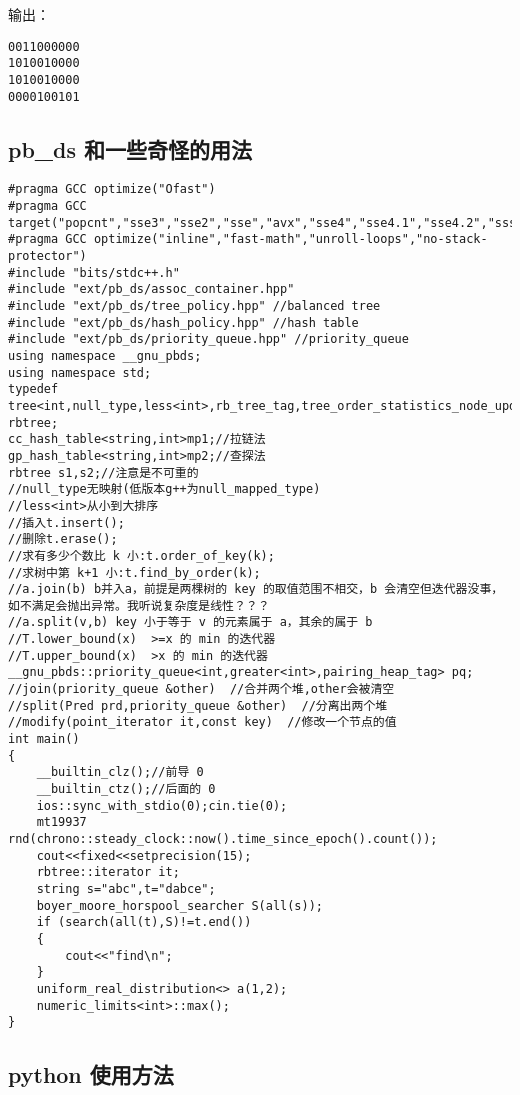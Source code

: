 \documentclass[12pt]{ctexart}
\begin{document}
输出：

\begin{verbatim}
0011000000
1010010000
1010010000
0000100101
\end{verbatim}

\subsection{pb\_ds 和一些奇怪的用法}

\begin{lstlisting}
#pragma GCC optimize("Ofast")
#pragma GCC target("popcnt","sse3","sse2","sse","avx","sse4","sse4.1","sse4.2","ssse3","f16c","fma","avx2","xop","fma4")
#pragma GCC optimize("inline","fast-math","unroll-loops","no-stack-protector")
#include "bits/stdc++.h"
#include "ext/pb_ds/assoc_container.hpp"
#include "ext/pb_ds/tree_policy.hpp" //balanced tree
#include "ext/pb_ds/hash_policy.hpp" //hash table
#include "ext/pb_ds/priority_queue.hpp" //priority_queue
using namespace __gnu_pbds;
using namespace std;
typedef tree<int,null_type,less<int>,rb_tree_tag,tree_order_statistics_node_update> rbtree;
cc_hash_table<string,int>mp1;//拉链法
gp_hash_table<string,int>mp2;//查探法
rbtree s1,s2;//注意是不可重的
//null_type无映射(低版本g++为null_mapped_type)
//less<int>从小到大排序
//插入t.insert();
//删除t.erase();
//求有多少个数比 k 小:t.order_of_key(k);
//求树中第 k+1 小:t.find_by_order(k);
//a.join(b) b并入a，前提是两棵树的 key 的取值范围不相交，b 会清空但迭代器没事，如不满足会抛出异常。我听说复杂度是线性？？？
//a.split(v,b) key 小于等于 v 的元素属于 a，其余的属于 b
//T.lower_bound(x)  >=x 的 min 的迭代器
//T.upper_bound(x)  >x 的 min 的迭代器
__gnu_pbds::priority_queue<int,greater<int>,pairing_heap_tag> pq;
//join(priority_queue &other)  //合并两个堆,other会被清空
//split(Pred prd,priority_queue &other)  //分离出两个堆
//modify(point_iterator it,const key)  //修改一个节点的值
int main()
{
    __builtin_clz();//前导 0
    __builtin_ctz();//后面的 0
	ios::sync_with_stdio(0);cin.tie(0);
	mt19937 rnd(chrono::steady_clock::now().time_since_epoch().count());
    cout<<fixed<<setprecision(15);
	rbtree::iterator it;
	string s="abc",t="dabce";
	boyer_moore_horspool_searcher S(all(s));
	if (search(all(t),S)!=t.end())
	{
		cout<<"find\n";
	}
    uniform_real_distribution<> a(1,2);
	numeric_limits<int>::max();
}
\end{lstlisting}

\subsection{python 使用方法}
\end{document}
